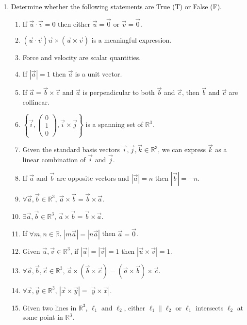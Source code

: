 \documentclass[12pt]{book}
\begin{document}
\begin{enumerate}

\item Determine whether the following statements are True (T) or False (F).

\begin{enumerate}
\item If $\vec{u} \cdot \vec{v} = 0$ then either $\vec{u} = \vec{0}$ or $\vec{v} = \vec{0}$.
\item $(\vec{u} \cdot \vec{v})\vec{u} \times (\vec{u} \times \vec{v})$ is a meaningful expression.
\item Force and velocity are scalar quantities.
\item If $|\vec{a}| = 1$ then $\vec{a}$ is a unit vector.
\item If $\vec{a} = \vec{b} \times \vec{c}$ and $\vec{a}$ is perpendicular to both $\vec{b}$ and $\vec{c}$, then $\vec{b}$ and $\vec{c}$ are collinear.
\item $\left\{ \vec{i}, \left(\begin{smallmatrix} 0 \\ 1 \\ 0 \end{smallmatrix}\right), \vec{i} \times \vec{j}\right\}$ is a spanning set of $\mathbb{R}^3$.
\item Given the standard basis vectors $\vec{i}, \vec{j}, \vec{k} \in \mathbb{R}^3$, we can express $\vec{k}$  as a linear combination of $\vec{i}$ and $\vec{j}$. 
\item If $\vec{a}$ and $\vec{b}$ are opposite vectors and $|\vec{a}| = n$ then $|\vec{b}| = -n$.
\item $\forall \vec{a}, \vec{b} \in \mathbb{R}^3$, $\vec{a} \times \vec{b} = \vec{b} \times \vec{a}$.
\item $\exists \vec{a}, \vec{b} \in \mathbb{R}^3$, $\vec{a} \times \vec{b} = \vec{b} \times \vec{a}$.
\item If $\forall m,n \in \mathbb{R}$, $|m\vec{a}| = |n\vec{a}|$ then $\vec{a}=\vec{0}$.
\item Given $\vec{u}, \vec{v} \in \mathbb{R}^3$, if $|\vec{u}| = |\vec{v}| = 1$ then $|\vec{u} \times \vec{v}| = 1$.
\item $\forall \vec{a}, \vec{b}, \vec{c} \in \mathbb{R}^3$, $\vec{a} \times (\vec{b} \times \vec{c}) = (\vec{a} \times \vec{b}) \times \vec{c}$.
\item $\forall \vec{x}, \vec{y} \in \mathbb{R}^3$, $|\vec{x} \times \vec{y}| = |\vec{y} \times \vec{x}|$.
\item Given two lines in $\mathbb{R}^3$, $\ell_1$ and $\ell_2$, either $\ell_1 \parallel \ell_2$ or $\ell_1$ intersects $\ell_2$ at some point in $\mathbb{R}^3$.

\end{enumerate}
\end{enumerate}
\end{document}
